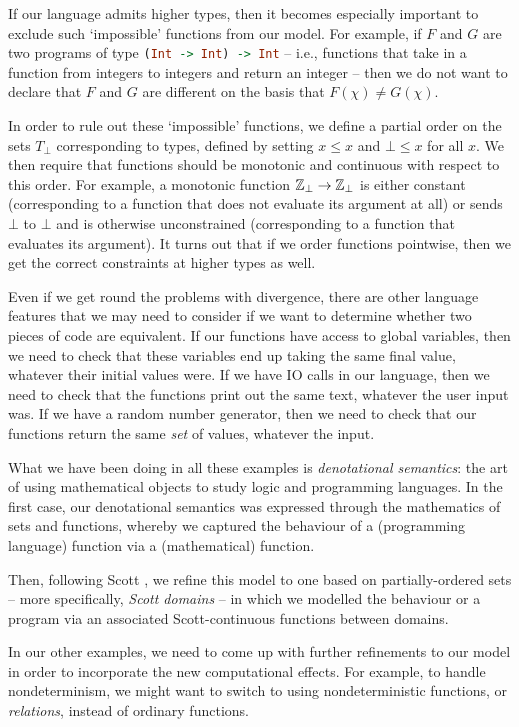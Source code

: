 If our language admits higher types, then it becomes especially important to exclude such `impossible' functions from our model.
For example, if $F$ and $G$ are two programs of type \lstinline[language=haskell]{(Int -> Int) -> Int} -- i.e., functions that take in a function from integers to integers and return an integer -- then we do not want to declare that $F$ and $G$ are different on the basis that $F(\chi)\ne G(\chi)$.  

In order to rule out these `impossible' functions, we define a partial order on the sets $T_\bot$ corresponding to types, defined by setting $x\le x$ and $\bot\le x$ for all $x$.
We then require that functions should be monotonic and continuous with respect to this order. 
For example, a monotonic function $\mathbb{Z}_\bot \to \mathbb{Z}_\bot$ is either constant (corresponding to a function that does not evaluate its argument at all) or sends $\bot$ to $\bot$ and is otherwise unconstrained (corresponding to a function that evaluates its argument).
It turns out that if we order functions pointwise, then we get the correct constraints at higher types as well.

Even if we get round the problems with divergence, there are other language features that we may need to consider if we want to determine whether two pieces of code are equivalent. 
If our functions have access to global variables, then we need to check that these variables end up taking the same final value, whatever their initial values were.
If we have IO calls in our language, then we need to check that the functions print out the same text, whatever the user input was.
If we have a random number generator, then we need to check that our functions return the same \emph{set} of values, whatever the input.

What we have been doing in all these examples is \emph{denotational semantics}: the art of using mathematical objects to study logic and programming languages.  
In the first case, our denotational semantics was expressed through the mathematics of sets and functions, whereby we captured the behaviour of a (programming language) function via a (mathematical) function.

Then, following Scott \cite{ScottDomains}, we refine this model to one based on partially-ordered sets -- more specifically, \emph{Scott domains} -- in which we modelled the behaviour or a program via an associated Scott-continuous functions between domains.

In our other examples, we need to come up with further refinements to our model in order to incorporate the new computational effects. 
For example, to handle nondeterminism, we might want to switch to using nondeterministic functions, or \emph{relations}, instead of ordinary functions.

